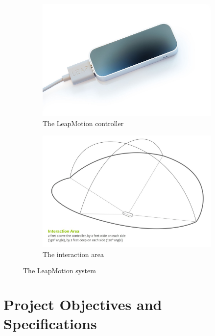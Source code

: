\documentclass[12pt,a4paper,twoside]{report}
\begin{document}
\begin{figure}[h]
  \centering
  \begin{subfigure}{0.45\textwidth}
    \includegraphics[width=\linewidth]{img/Leap_motion.jpg}
    \caption{The LeapMotion controller}
    \label{fig:leap_controller}
  \end{subfigure}
  \begin{subfigure}{0.45\textwidth}
    \includegraphics[width=\linewidth]{img/Leap_interaction.png}
    \caption{The interaction area}
    \label{fig:leap_interaction}
  \end{subfigure}
  \caption{The LeapMotion system}
\end{figure}



\chapter{Project Objectives and Specifications}
\end{document}

